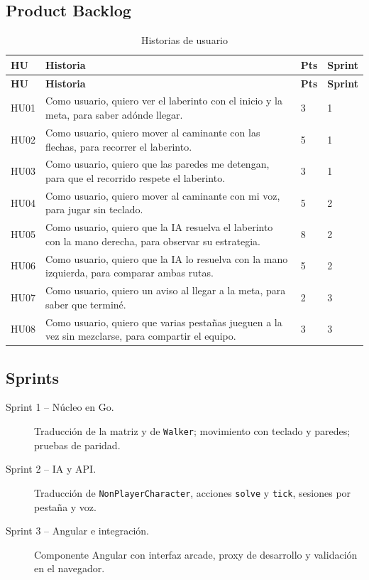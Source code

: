 \documentclass[12pt,a4paper]{article}
\begin{document}
\subsection{Product Backlog}
\begin{longtable}{p{1.1cm}p{8.6cm}p{1.2cm}p{1.6cm}}
\caption{Historias de usuario}\\
\toprule
\textbf{HU} & \textbf{Historia} & \textbf{Pts} & \textbf{Sprint}\\
\midrule\endfirsthead
\toprule
\textbf{HU} & \textbf{Historia} & \textbf{Pts} & \textbf{Sprint}\\
\midrule\endhead
HU01 & Como usuario, quiero ver el laberinto con el inicio y la meta, para saber adónde llegar. & 3 & 1\\
HU02 & Como usuario, quiero mover al caminante con las flechas, para recorrer el laberinto. & 5 & 1\\
HU03 & Como usuario, quiero que las paredes me detengan, para que el recorrido respete el laberinto. & 3 & 1\\
HU04 & Como usuario, quiero mover al caminante con mi voz, para jugar sin teclado. & 5 & 2\\
HU05 & Como usuario, quiero que la IA resuelva el laberinto con la mano derecha, para observar su estrategia. & 8 & 2\\
HU06 & Como usuario, quiero que la IA lo resuelva con la mano izquierda, para comparar ambas rutas. & 5 & 2\\
HU07 & Como usuario, quiero un aviso al llegar a la meta, para saber que terminé. & 2 & 3\\
HU08 & Como usuario, quiero que varias pestañas jueguen a la vez sin mezclarse, para compartir el equipo. & 3 & 3\\
\bottomrule
\end{longtable}

\subsection{Sprints}
\begin{description}
  \item[Sprint 1 -- Núcleo en Go.] Traducción de la matriz y de \texttt{Walker}; movimiento con teclado y paredes; pruebas de paridad.
  \item[Sprint 2 -- IA y API.] Traducción de \texttt{NonPlayerCharacter}, acciones \texttt{solve} y \texttt{tick}, sesiones por pestaña y voz.
  \item[Sprint 3 -- Angular e integración.] Componente Angular con interfaz arcade, proxy de desarrollo y validación en el navegador.
\end{description}
\end{document}
